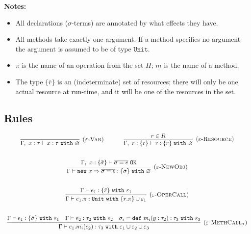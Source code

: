 \documentclass{llncs}
\newcommand{\keywadj}[1]{\mathtt{#1}}
\newcommand{\keyw}[1]{\keywadj{#1}~}
\begin{document}
\noindent \textbf{Notes:}

\begin{itemize}
	\item All declarations ($\sigma$-terms) are annotated by what effects they have.
	\item All methods take exactly one argument. If a method specifies no argument the argument is assumed to be of type $\keywadj{Unit}$.
	\item $\pi$ is the name of an operation from the set $\Pi$; $m$ is the name of a method.
	\item The type $\{ \bar r \}$ is an (indeterminate) set of resources; there will only be one actual resource at run-time, and it will be one of the resources in the set.
\end{itemize}

\subsection{Rules}

\fbox{$\Gamma \vdash e : \tau~\keyw{with} \varepsilon$}

\[
\begin{array}{c}
\infer[\textsc{($\varepsilon$-Var)}]
  {\Gamma,~x:\tau \vdash x:\tau~ \keyw{with} \varnothing}
  {} 
~~~~~~~~~~
\infer[\textsc{($\varepsilon$-Resource)}]
  {\Gamma,~r :\{r\} \vdash r:\{ r \} ~ \keyw{with} \varnothing}
  {r \in R} \\[5ex]

\infer[\textsc{($\varepsilon$-NewObj)}]
	{\Gamma \vdash \keywadj{new}~x \Rightarrow \overline{\sigma = e} : \{ \bar \sigma \}~\keyw{with} \varnothing}
	{\Gamma,~x : \{ \bar \sigma \} \vdash \overline{\sigma = e}~\keywadj{OK}} \\[5ex]

\infer[\textsc{($\varepsilon$-OperCall)}]
	{\Gamma \vdash e_1.\pi : \keyw{Unit} \keyw{with} \{ \bar r.\pi \} \cup \varepsilon_1}
	{\Gamma \vdash e_1 : \{ \bar r \}~ \keyw{with} \varepsilon_1} \\[5ex]
	
\infer[\textsc{($\varepsilon$-MethCall$_\sigma$)}]
	{\Gamma \vdash e_1.m_i(e_2):\tau_3~\keyw{with} \varepsilon_1 \cup \varepsilon_2 \cup \varepsilon_3}
	{\Gamma \vdash e_1 : \{ \bar \sigma \}~\keyw{with} \varepsilon_1 & \Gamma \vdash e_2 : \tau_2~\keyw{with} \varepsilon_2 & \sigma_i = \keyw{def} m_i(y:\tau_2):\tau_3~\keyw{with} \varepsilon_3}

\end{array}
\]
\end{document}

